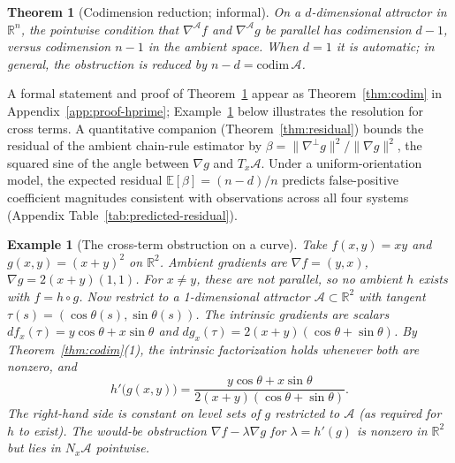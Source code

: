 \documentclass{article}
\newtheorem{example}{Example}
\newtheorem{theorem}{Theorem}
\begin{document}
\begin{theorem}[Codimension reduction; informal]\label{thm:codim-informal}
On a $d$-dimensional attractor in $\mathbb{R}^n$, the pointwise condition
that $\nabla^{\!\mathcal{A}} f$ and $\nabla^{\!\mathcal{A}} g$ be parallel
has codimension $d-1$, versus codimension $n-1$ in the ambient space.
When $d=1$ it is automatic; in general, the obstruction is reduced by
$n-d = \mathrm{codim}\,\mathcal{A}$.
\end{theorem}

A formal statement and proof of Theorem~\ref{thm:codim-informal} appear as Theorem~\ref{thm:codim} in Appendix~\ref{app:proof-hprime}; Example~\ref{ex:cross} below illustrates the resolution for cross terms.
A quantitative companion (Theorem~\ref{thm:residual}) bounds the residual of the ambient chain-rule estimator by $\beta = \|\nabla^{\!\perp} g\|^2/\|\nabla g\|^2$, the squared sine of the angle between $\nabla g$ and $T_x\mathcal{A}$. 
Under a uniform-orientation model, the expected residual $\mathbb{E}[\beta]=(n-d)/n$ predicts false-positive coefficient magnitudes consistent with observations across all four systems (Appendix Table~\ref{tab:predicted-residual}).

\begin{example}[The cross-term obstruction on a curve]
\label{ex:cross}
Take $f(x,y)=xy$ and $g(x,y)=(x+y)^2$ on $\mathbb{R}^2$. Ambient
gradients are $\nabla f=(y,x)$, $\nabla g = 2(x+y)(1,1)$. For
$x\neq y$, these are not parallel, so no ambient $h$ exists with
$f = h\circ g$. Now restrict to a 1-dimensional attractor
$\mathcal{A}\subset\mathbb{R}^2$ with tangent $\tau(s)=(\cos\theta(s),
\sin\theta(s))$. The intrinsic gradients are scalars
$df_x(\tau)=y\cos\theta + x\sin\theta$ and
$dg_x(\tau)=2(x+y)(\cos\theta+\sin\theta)$. By Theorem~\ref{thm:codim}(1),
the intrinsic factorization holds whenever both are nonzero, and
$$
  h'\bigl(g(x,y)\bigr) =
    \frac{y\cos\theta + x\sin\theta}{2(x+y)(\cos\theta+\sin\theta)}.
$$
The right-hand side is constant on level sets of $g$ restricted to
$\mathcal{A}$ (as required for $h$ to exist). The would-be obstruction
$\nabla f - \lambda\nabla g$ for $\lambda = h'(g)$ is nonzero in
$\mathbb{R}^2$ but lies in $N_x\mathcal{A}$ pointwise.
\end{example}
\end{document}
